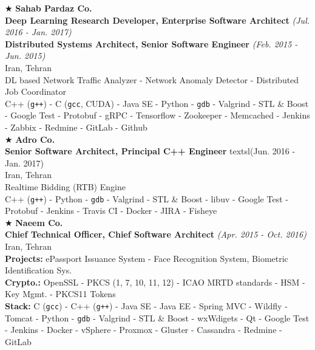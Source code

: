 \documentclass[10pt,a4paper]{article}
\begin{document}
\noindent $\bigstar$ \hspace{0.1cm} \large \textbf{Sahab Pardaz Co.} \\ 
\indent \small \textbf{Deep Learning Research Developer, Enterprise Software Architect} \textsl{(Jul. 2016 - Jan. 2017)} \\
\indent \small \textbf{Distributed Systems Architect, Senior Software Engineer} \textsl{(Feb. 2015 - Jun. 2015)} \\
\indent \textnormal{Iran, Tehran} \\
\indent \textbullet \hspace{0.05cm} DL based Network Traffic Analyzer - Network Anomaly Detector - Distributed Job Coordinator\\
\indent \textbullet \hspace{0.05cm} C++ (\texttt{g++}) - C (\texttt{gcc}, CUDA) - Java SE - Python - \texttt{gdb} - Valgrind - STL \& Boost - Google Test - Protobuf - gRPC - Tensorflow - Zookeeper - Memcached - Jenkins - Zabbix - Redmine - GitLab - Github \\

\noindent $\bigstar$ \hspace{0.1cm} \large \textbf{Adro Co.} \\
\indent \small \textbf{Senior Software Architect, Principal C++ Engineer} textsl{(Jun. 2016 - Jan. 2017)} \\
\indent \textnormal{Iran, Tehran} \\
\indent \textbullet \hspace{0.05cm} Realtime Bidding (RTB) Engine \\
\indent \textbullet \hspace{0.05cm} C++ (\texttt{g++}) - Python - \texttt{gdb} - Valgrind - STL \& Boost - libuv - Google Test - Protobuf - Jenkins - Travis CI - Docker - JIRA - Fisheye \\

\noindent $\bigstar$ \hspace{0.1cm} \large \textbf{Naeem Co.} \\
\indent \small \textbf{Chief Technical Officer, Chief Software Architect} \textsl{(Apr. 2015 - Oct. 2016)} \\
\indent \textnormal{Iran, Tehran} \\
\indent \textbullet \hspace{0.05cm} \textbf{Projects:} ePassport Issuance System - Face Recognition System, Biometric Identification Sys. \\
\indent \textbullet \hspace{0.05cm} \textbf{Crypto.:} OpenSSL - PKCS (1, 7, 10, 11, 12) - ICAO MRTD standards - HSM - Key Mgmt. - PKCS11 Tokens\\
\indent \textbullet \hspace{0.05cm} \textbf{Stack:} C (\texttt{gcc}) - C++ (\texttt{g++}) - Java SE - Java EE - Spring MVC - Wildfly - Tomcat - Python - \texttt{gdb} - Valgrind - STL \& Boost - wxWdigets - Qt - Google Test - Jenkins - Docker - vSphere - Proxmox - Gluster - Cassandra - Redmine - GitLab \\
\end{document}
